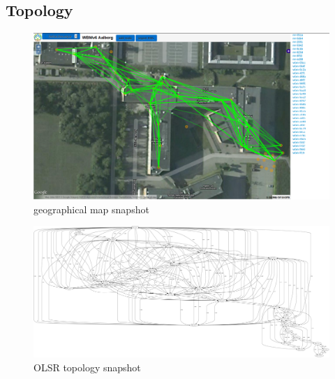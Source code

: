 \documentclass[a4paper,12pt,twoside]{article}
\begin{document}
\subsection{Topology}

\begin{figure}[!ht]
\centering
\includegraphics[width=1.4\textwidth, angle=90]{figures/geographical_map2.png}
\caption{geographical map snapshot}
\label{fig:geomap}
\end{figure}



\begin{figure}[!ht]
\centering
\includegraphics[width=1.4\textwidth, angle=90]{figures/topo0.pdf}
\caption{OLSR topology snapshot}
\label{fig:olsr-topo}
\end{figure}

%
\end{document}
